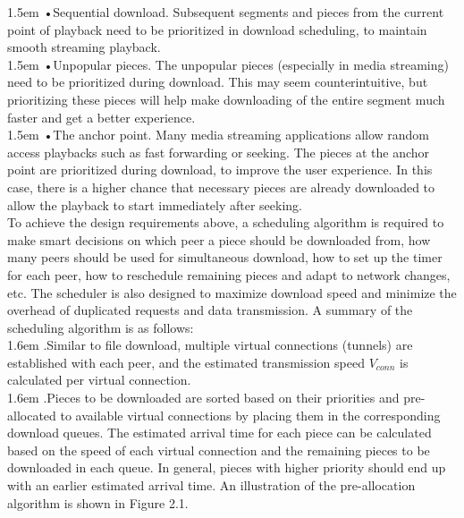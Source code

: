 \documentclass[10pt,a4paper]{article}
\begin{document}
\hangindent 1.5em
\noindent   
•\quad Sequential download. Subsequent segments and pieces from the current point of playback need to be prioritized in download scheduling, to maintain smooth streaming playback.
\vspace{-0.8em}
\\

\hangindent 1.5em
\noindent   
•\quad Unpopular pieces. The unpopular pieces (especially in media streaming) need to be prioritized during download. This may seem counterintuitive, but prioritizing these pieces will help make downloading of the entire segment much faster and get a better experience.
\vspace{-0.8em}
\\ 

\hangindent 1.5em
\noindent   
•\quad The anchor point. Many media streaming applications allow random access playbacks such as fast forwarding or seeking. The pieces at the anchor point are prioritized during download, to improve the user experience. In this case, there is a higher chance that necessary pieces are already downloaded to allow the playback to start immediately after seeking.
\vspace{-0.6em}
\\ 

\noindent   
To achieve the design requirements above, a scheduling algorithm is required to make smart decisions on which peer a piece should be downloaded from, how many peers should be used for simultaneous download, how to set up the timer for each peer, how to reschedule remaining pieces and adapt to network changes, etc. The scheduler is also designed to maximize download speed and minimize the overhead of duplicated requests and data transmission. A summary of the scheduling algorithm is as follows:
\vspace{-0.8em}
\\ 

\hangindent 1.6em
.\quad  Similar to file download, multiple virtual connections (tunnels) are established with each peer, and the estimated transmission speed $V_{conn}$ is calculated per virtual connection.
\vspace{-0.8em}
\\ 

\hangindent 1.6em
.\quad Pieces to be downloaded are sorted based on their priorities and pre-allocated to available virtual connections by placing them in the corresponding download queues. The estimated arrival time for each piece can be calculated based on the speed of each virtual connection and the remaining pieces to be downloaded in each queue. In general, pieces with higher priority should end up with an earlier estimated arrival time. An illustration of the pre-allocation algorithm is shown in Figure 2.1.
\vspace{-0.8em}
\\ 
\end{document}
